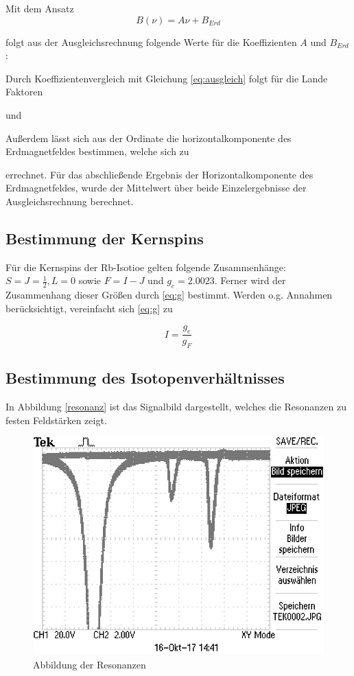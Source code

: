 Mit dem Ansatz
\begin{equation}
B(\nu) = A\nu + B_{Erd}
\end{equation}

folgt aus der Ausgleichsrechnung folgende Werte für die Koeffizienten $A$ und $B_{Erd}$:



Durch Koeffizientenvergleich mit Gleichung \ref{eq:ausgleich} folgt für die Lande Faktoren



und



Außerdem lässt sich aus der Ordinate die horizontalkomponente des Erdmagnetfeldes bestimmen,
welche sich zu



errechnet. Für das abschließende Ergebnis der Horizontalkomponente des Erdmagnetfeldes, wurde der Mittelwert über beide Einzelergebnisse der Ausgleichsrechnung berechnet.

\subsection{Bestimmung der Kernspins}
Für die Kernspins der Rb-Isotioe gelten folgende Zusammenhänge: $S = J = \frac{1}{2} , L = 0$ sowie $F = I - J$ und $g_e = 2.0023$. Ferner wird
der Zusammenhang dieser Größen durch \ref{eq:g} bestimmt. Werden o.g. Annahmen berücksichtigt, vereinfacht sich \ref{eq:g} zu

\begin{equation}
I = \frac{g_e}{g_F}
\end{equation}

\subsection{Bestimmung des Isotopenverhältnisses}
In Abbildung \autoref{resonanz} ist das Signalbild dargestellt, welches die Resonanzen zu festen
Feldstärken zeigt.

\begin{figure}[h]
\centering
\includegraphics[scale=0.8]{img/TEK0002.JPG}
\caption{Abbildung der Resonanzen}
\label{resonanz}
\end{figure}


